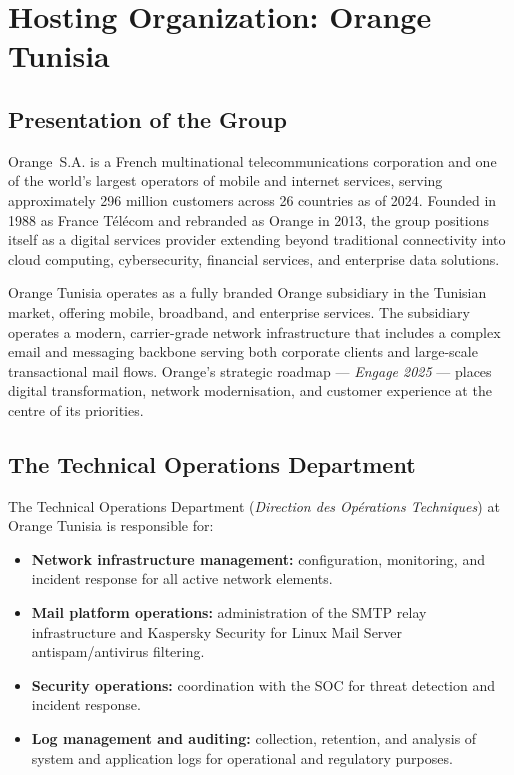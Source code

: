 \documentclass[12pt,a4paper,oneside]{report}
\begin{document}
\section{Hosting Organization: Orange Tunisia}

\subsection{Presentation of the Group}

Orange~S.A. is a French multinational telecommunications corporation and one of the world's largest operators of mobile and internet services, serving approximately 296 million customers across 26 countries as of 2024.
Founded in 1988 as France Télécom and rebranded as Orange in 2013, the group positions itself as a digital services provider extending beyond traditional connectivity into cloud computing, cybersecurity, financial services, and enterprise data solutions.

Orange Tunisia operates as a fully branded Orange subsidiary in the Tunisian market, offering mobile, broadband, and enterprise services.
The subsidiary operates a modern, carrier-grade network infrastructure that includes a complex email and messaging backbone serving both corporate clients and large-scale transactional mail flows.
Orange's strategic roadmap --- \emph{Engage 2025} --- places digital transformation, network modernisation, and customer experience at the centre of its priorities.

\subsection{The Technical Operations Department}

The Technical Operations Department (\emph{Direction des Opérations Techniques}) at Orange Tunisia is responsible for:

\begin{itemize}
  \item \textbf{Network infrastructure management:} configuration, monitoring, and incident response for all active network elements.
  \item \textbf{Mail platform operations:} administration of the SMTP relay infrastructure and Kaspersky Security for Linux Mail Server antispam/antivirus filtering.
  \item \textbf{Security operations:} coordination with the SOC for threat detection and incident response.
  \item \textbf{Log management and auditing:} collection, retention, and analysis of system and application logs for operational and regulatory purposes.
\end{itemize}
\end{document}
